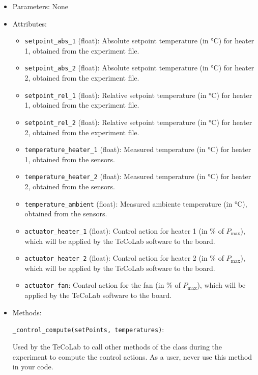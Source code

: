 \documentclass[12pt]{report}
\begin{document}
\begin{itemize}

\item Parameters: None

\item Attributes:

\begin{itemize}
\item \texttt{setpoint\_abs\_1} (float): Absolute setpoint temperature (in °C) for heater 1, obtained from the experiment file.

\item \texttt{setpoint\_abs\_2} (float): Absolute setpoint temperature (in °C) for heater 2, obtained from the experiment file.

\item \texttt{setpoint\_rel\_1} (float): Relative setpoint temperature (in °C) for heater 1, obtained from the experiment file.

\item \texttt{setpoint\_rel\_2} (float): Relative setpoint temperature (in °C) for heater 2, obtained from the experiment file.

\item \texttt{temperature\_heater\_1} (float): Measured temperature (in °C) for heater 1, obtained from the sensors.

\item \texttt{temperature\_heater\_2} (float): Measured temperature (in °C) for heater 2, obtained from the sensors.

\item \texttt{temperature\_ambient} (float): Measured ambiente temperature (in °C), obtained from the sensors.

\item \texttt{actuator\_heater\_1} (float): Control action for heater 1 (in \% of $P_{\text{max}}$), which will be applied by the TeCoLab software to the board.

\item \texttt{actuator\_heater\_2} (float): Control action for heater 2 (in \% of $P_{\text{max}}$), which will be applied by the TeCoLab software to the board.

\item \texttt{actuator\_fan}: Control action for the fan (in \% of $P_{\text{max}}$), which will be applied by the TeCoLab software to the board.
\end{itemize}

\item Methods:

\texttt{\_control\_compute(setPoints, temperatures)}:

Used by the TeCoLab to call other methods of the class during the experiment to compute the control actions. As a user, never use this method in your code.

\end{itemize}
\end{document}
